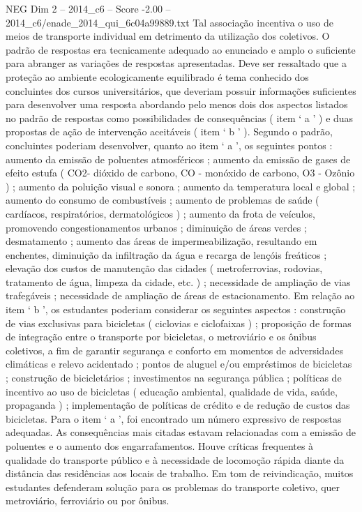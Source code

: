 \begin{textsample}{NEG Dim 2 – 2014\_c6 – Score -2.00 – 2014\_c6/enade\_2014\_qui\_6c04a99889.txt}
Tal associação incentiva o uso de meios de transporte individual em detrimento da utilização dos coletivos.
O padrão de respostas era tecnicamente adequado ao enunciado e amplo o suficiente para abranger as variações de respostas apresentadas.
Deve ser ressaltado que a proteção ao ambiente ecologicamente equilibrado é tema conhecido dos concluintes dos cursos universitários, que deveriam possuir informações suficientes para desenvolver uma resposta abordando pelo menos dois dos aspectos listados no padrão de respostas como possibilidades de consequências ( item ‘ a ’ ) e duas propostas de ação de intervenção aceitáveis ( item ‘ b ’ ).
Segundo o padrão, concluintes poderiam desenvolver, quanto ao item ‘ a ’, os seguintes pontos : aumento da emissão de poluentes atmosféricos ; aumento da emissão de gases de efeito estufa ( CO2- dióxido de carbono, CO - monóxido de carbono, O3 - Ozônio ) ; aumento da poluição visual e sonora ; aumento da temperatura local e global ; aumento do consumo de combustíveis ; aumento de problemas de saúde ( cardíacos, respiratórios, dermatológicos ) ; aumento da frota de veículos, promovendo congestionamentos urbanos ; diminuição de áreas verdes ; desmatamento ; aumento das áreas de impermeabilização, resultando em enchentes, diminuição da infiltração da água e recarga de lençóis freáticos ; elevação dos custos de manutenção das cidades ( metroferrovias, rodovias, tratamento de água, limpeza da cidade, etc. ) ; necessidade de ampliação de vias trafegáveis ; necessidade de ampliação de áreas de estacionamento.
Em relação ao item ‘ b ’, os estudantes poderiam considerar os seguintes aspectos : construção de vias exclusivas para bicicletas ( ciclovias e ciclofaixas ) ; proposição de formas de integração entre o transporte por bicicletas, o metroviário e os ônibus coletivos, a fim de garantir segurança e conforto em momentos de adversidades climáticas e relevo acidentado ; pontos de aluguel e/ou empréstimos de bicicletas ; construção de bicicletários ; investimentos na segurança pública ; políticas de incentivo ao uso de bicicletas ( educação ambiental, qualidade de vida, saúde, propaganda ) ; implementação de políticas de crédito e de redução de custos das bicicletas.
Para o item ‘ a ’, foi encontrado um número expressivo de respostas adequadas.
As consequências mais citadas estavam relacionadas com a emissão de poluentes e o aumento dos engarrafamentos.
Houve críticas frequentes à qualidade do transporte público e à necessidade de locomoção rápida diante da distância das residências aos locais de trabalho.
Em tom de reivindicação, muitos estudantes defenderam solução para os problemas do transporte coletivo, quer metroviário, ferroviário ou por ônibus.

\end{textsample}
